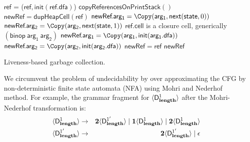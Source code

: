 \documentclass[9pt]{sigplanconf}
\begin{document}
\begin{algorithm}[t!]
  \Pro{\Lgc{}}
     {
            {$\mathsf{ref}$ = \Copy($\mathsf{ref}, \mathsf{init}(\mathsf{ref.dfa})$)\;}
            ${\mathsf{copyReferencesOnPrintStack}()}$\;  
     }
        {
             {
               $\mathsf{newRef} = \mathsf{dupHeapCell}(\mathsf{ref})$\;
                  {
                    {
                      $\mathsf{newRef}\!.\mathsf{arg_1}  = \Copy(\mathsf{arg_1}, \mathsf{next}(\mathsf{state}, 0))$\;
                    }
                    {
                      $\mathsf{newRef}\!.\mathsf{arg_2} =  \Copy(\mathsf{arg_2},
                      \mathsf{next}(\mathsf{state} , 1))$\;
                    }    
                  }
               \If
                  {$\mathsf{ref\!.cell}$ is a
                    closure cell, generically  $\mathsf{(binop~arg_1~arg_2)}$}
                   { 
                     $\mathsf{newRef}\!.\mathsf{arg_1} = \Copy(\mathsf{arg_1}, \mathsf{init}(\mathsf{arg_1.dfa}))$\;
                     $\mathsf{newRef}\!.\mathsf{arg_2} = \Copy(\mathsf{arg_2}, \mathsf{init}(\mathsf{arg_2.dfa}))$\;
                   }
             }
             {$\mathsf{newRef = ref}$}
\KwRet $\mathsf{newRef}$\;
        }
        \caption{Liveness-based garbage collection.  \label{algo:lgc-a}}
\end{algorithm}


We circumvent the problem of undecidability by over approximating the
CFG by non-deterministic finite state automata (NFA) using
Mohri  and Nederhof~\cite{mohri00regular} method.
For example, the grammar fragment for %
$\langle \mathsf{D}_{\mathit {\mathbf{length}}}^{1}\rangle$ after the Mohri-Nederhof transformation is:
 \begin{eqnarray*}
   \langle \mathsf{D}_{\mathit {\mathbf{length}}}^{1}\rangle &\rightarrow& {\mathbf{2}}\langle \mathsf{D}_{\mathit {\mathbf{length}}}^{1'}\rangle \mid
   \mathbf{1}\langle \mathsf{D}_{\mathit {\mathbf{length}}}^{1}\rangle
   \mid {\mathbf{2}}\langle \mathsf{D}_{\mathit {\mathbf{length}}}^{1}\rangle\\
   \langle \mathsf{D}_{\mathit {\mathbf{length}}}^{1'}\rangle &\rightarrow& {\mathbf{2}}\langle \mathsf{D}_{\mathit {\mathbf{length}}}^{1'}\rangle
   \mid \epsilon
 \end{eqnarray*}
\end{document}
